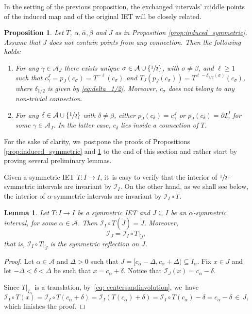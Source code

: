 \documentclass[10pt,a4paper]{amsart}
\theoremstyle{plain}
\newtheorem{lemma}[theorem]{Lemma}
\newtheorem{proposition}[theorem]{Proposition}
\theoremstyle{definition}
\newcommand{\A}{\mathcal{A}}
\newcommand{\I}{\mathcal{I}}
\begin{document}
In the setting of the previous proposition, the exchanged intervals' middle points of the induced map and of the original IET will be closely related.

\begin{proposition}
\label{prop:induced_centers}
Let $T$, $\alpha, \hat \alpha, \beta$ and $J$ as in Proposition \ref{prop:induced_symmetric}. Assume that $J$ does not contain points from any connection. Then the following holds:
\begin{enumerate}
\item For any $\gamma \in \A_J$ there exists unique $\sigma \in \A \cup \{\sfrac{1}{2}\}$, with $ \sigma \neq \beta$, and $\ell \geq 1$ such that $c_\gamma^J = p_J(c_\sigma) = T^{-\ell}(c_\sigma)$ and $T_J(p_J(c_\sigma)) = T^{\ell - \delta_{1/2}(\sigma)}(c_\sigma)$, where $\delta_{1/2}$ is given by \eqref{eq:delta_1/2}. Moreover, $c_\sigma$ does not belong to any non-trivial connection.
\item For any $\delta \in \A \cup \{\sfrac{1}{2}\}$ with $\delta \neq \beta$, either $p_J(c_\delta) = c_\gamma^J$ or $p_J(c_\delta) = \partial I_\gamma^J$ for some $\gamma \in \A_J$. In the latter case, $c_\delta$ lies inside a connection of $T$.
\end{enumerate}
\end{proposition}

For the sake of clarity, we~postpone the proofs of Propositions \ref{prop:induced_symmetric} and \ref{prop:induced_centers} to the end of this section and rather start by proving several preliminary lemmas.

Given a symmetric IET $T: I \to I$, it~is easy to verify that the interior of $\sfrac{1}{2}$\nobreak-sym\-metric intervals are invariant by $\I_I$. On the other hand, as we shall see below, the interior of $\alpha$-symmetric intervals are invariant by $\I_I \circ T$.

\begin{lemma}\label{lem: local_reflection}
Let $T : I \to I$ be a symmetric IET and $J \subseteq I$ be an $\alpha$-symmetric interval, for some $\alpha \in \A$. Then $\mathcal{I}_I\circ T(\mathring{J}) = \mathring{J}$. Moreover,
\[
\I_J = \mathcal{I}_I\circ T|_{\mathring{J}},
\]
that is, $\mathcal{I}_I\circ T|_{\mathring{J}}$ is the symmetric reflection on $J$.
\end{lemma}

\begin{proof}
Let $\alpha \in \A$ and $\Delta > 0$ such that $J = [c_\alpha - \Delta, c_\alpha + \Delta) \subseteq I_\alpha$. Fix $x\in J$ and let $-\Delta < \delta < \Delta$ be such that $x = c_{\alpha}+\delta$. Notice that $\I_J(x) = c_\alpha - \delta$.

Since $T|_{I_{\alpha}}$ is a translation, by~\eqref{eq: centersandinvolution}, we~have
\[
\I_I\circ T(x)=\I_I\circ T(c_{\alpha}+\delta)=\I_I\left(T(c_{\alpha}) +\delta\right)=
\I_I\circ T(c_{\alpha})-\delta=c_{\alpha}-\delta\,\in\, J,
\]
which finishes the proof.
\end{proof}
\end{document}
